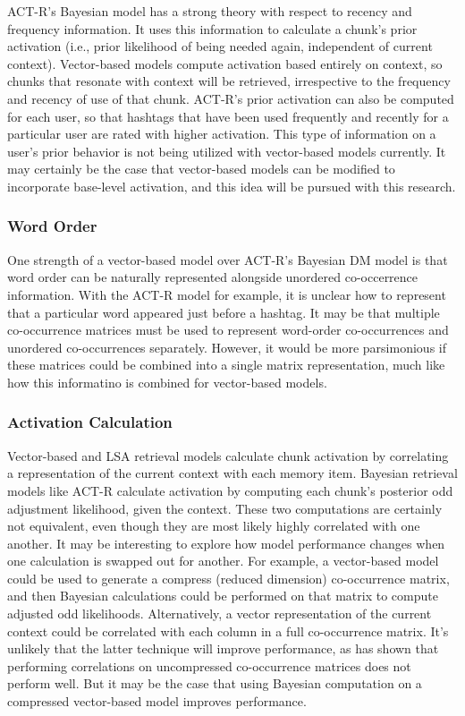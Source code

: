 \documentclass[man,floatsintext]{apa6}
\begin{document}
ACT-R's Bayesian model has a strong theory with respect to recency and frequency information.
It uses this information to calculate a chunk's prior activation (i.e., prior likelihood of being needed again, independent of current context).
Vector-based models compute activation based entirely on context, so chunks that resonate with context will be retrieved, irrespective to the frequency and recency of use of that chunk.
ACT-R's prior activation can also be computed for each user, so that hashtags that have been used frequently and recently for a particular user are rated with higher activation.
This type of information on a user's prior behavior is not being utilized with vector-based models currently.
It may certainly be the case that vector-based models can be modified to incorporate base-level activation, and this idea will be pursued with this research.

\subsubsection{Word Order}

One strength of a vector-based model over ACT-R's Bayesian DM model is that word order can be naturally represented alongside unordered co-occerrence information.
With the ACT-R model for example, it is unclear how to represent that a particular word appeared just before a hashtag. 
It may be that multiple co-occurrence matrices must be used to represent word-order co-occurrences and unordered co-occurrences separately.
However, it would be more parsimonious if these matrices could be combined into a single matrix representation, much like how this informatino is combined for vector-based models.

\subsubsection{Activation Calculation}

Vector-based and LSA retrieval models calculate chunk activation by correlating a representation of the current context with each memory item.
Bayesian retrieval models like ACT-R calculate activation by computing each chunk's posterior odd adjustment likelihood, given the context.
These two computations are certainly not equivalent, even though they are most likely highly correlated with one another.
It may be interesting to explore how model performance changes when one calculation is swapped out for another.
For example, a vector-based model could be used to generate a compress (reduced dimension) co-occurrence matrix, and then Bayesian calculations could be performed on that matrix to compute adjusted odd likelihoods.
Alternatively, a vector representation of the current context could be correlated with each column in a full co-occurrence matrix.
It's unlikely that the latter technique will improve performance, as \textcite{Landauer1997} has shown that performing correlations on uncompressed co-occurrence matrices does not perform well.
But it may be the case that using Bayesian computation on a compressed vector-based model improves performance.
\end{document}
